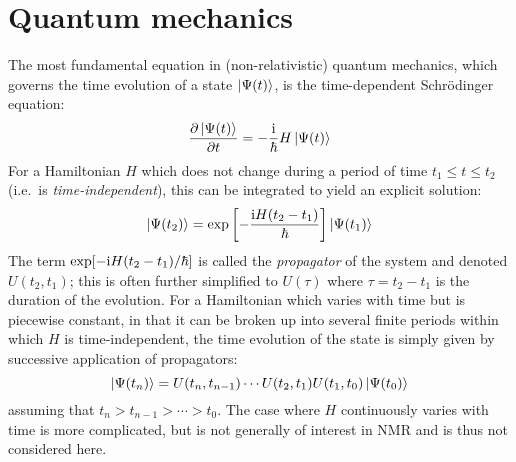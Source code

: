 \section{Quantum mechanics}
\label{sec:theory__quantum_mechanics}

The most fundamental equation in (non-relativistic) quantum mechanics, which governs the time evolution of a state $\ket{\Psi(t)}$, is the time-dependent Schr\"{o}dinger equation:
\begin{equation}
    \label{eq:tdse}
    \frac{\partial\ket{\Psi(t)}}{\partial t} = -\frac{\mathrm{i}}{\hbar}H\ket{\Psi(t)} 
\end{equation}
For a Hamiltonian $H$ which does not change during a period of time $t_1 \leq t \leq t_2$ (i.e.\ is \textit{time-independent}), this can be integrated to yield an explicit solution:
\begin{equation}
    \label{eq:time_evolution}
    \ket{\Psi(t_2)} = \exp\left[-\frac{\mathrm{i} H (t_2 - t_1)}{\hbar}\right]\ket{\Psi(t_1)}
\end{equation}
The term $\exp[-\mathrm{i} H(t_2 - t_1)/\hbar]$ is called the \textit{propagator} of the system and denoted $U(t_2, t_1)$; this is often further simplified to $U(\tau)$ where $\tau = t_2 - t_1$ is the duration of the evolution.
For a Hamiltonian which varies with time but is piecewise constant, in that it can be broken up into several finite periods within which $H$ is time-independent, the time evolution of the state is simply given by successive application of propagators:
\begin{equation}
    \label{eq:time_evolution_piecewise}
    \ket{\Psi(t_n)} = U(t_n,t_{n-1})\cdots U(t_2,t_1)U(t_1,t_0) \ket{\Psi(t_0)}
\end{equation}
assuming that $t_n > t_{n-1} > \cdots > t_0$.
The case where $H$ continuously varies with time is more complicated, but is not generally of interest in NMR and is thus not considered here.

